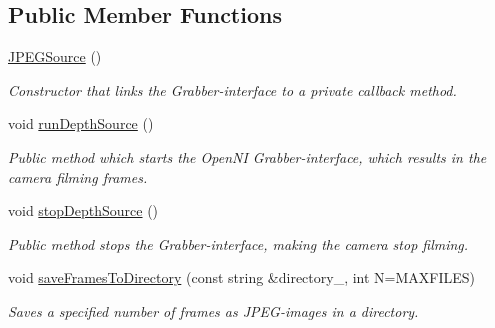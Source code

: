 \subsection*{Public Member Functions}
\begin{DoxyCompactItemize}
\item 
\hypertarget{class_j_p_e_g_source_a8031365b63a6b84707ef28f1a2764d66}{\hyperlink{class_j_p_e_g_source_a8031365b63a6b84707ef28f1a2764d66}{J\+P\+E\+G\+Source} ()}\label{class_j_p_e_g_source_a8031365b63a6b84707ef28f1a2764d66}

\begin{DoxyCompactList}\small\item\em Constructor that links the Grabber-\/interface to a private callback method. \end{DoxyCompactList}\item 
\hypertarget{class_j_p_e_g_source_a501129d208fcd46be517d5fb3c4450a9}{void \hyperlink{class_j_p_e_g_source_a501129d208fcd46be517d5fb3c4450a9}{run\+Depth\+Source} ()}\label{class_j_p_e_g_source_a501129d208fcd46be517d5fb3c4450a9}

\begin{DoxyCompactList}\small\item\em Public method which starts the Open\+N\+I Grabber-\/interface, which results in the camera filming frames. \end{DoxyCompactList}\item 
\hypertarget{class_j_p_e_g_source_aaf302834547c84cfef183f8bd9118292}{void \hyperlink{class_j_p_e_g_source_aaf302834547c84cfef183f8bd9118292}{stop\+Depth\+Source} ()}\label{class_j_p_e_g_source_aaf302834547c84cfef183f8bd9118292}

\begin{DoxyCompactList}\small\item\em Public method stops the Grabber-\/interface, making the camera stop filming. \end{DoxyCompactList}\item 
\hypertarget{class_j_p_e_g_source_a61879d7dfa602fb421bafe7cf07c4ae5}{void \hyperlink{class_j_p_e_g_source_a61879d7dfa602fb421bafe7cf07c4ae5}{save\+Frames\+To\+Directory} (const string \&directory\+\_\+, int N=M\+A\+X\+F\+I\+L\+E\+S)}\label{class_j_p_e_g_source_a61879d7dfa602fb421bafe7cf07c4ae5}

\begin{DoxyCompactList}\small\item\em Saves a specified number of frames as J\+P\+E\+G-\/images in a directory. \end{DoxyCompactList}\end{DoxyCompactItemize}
